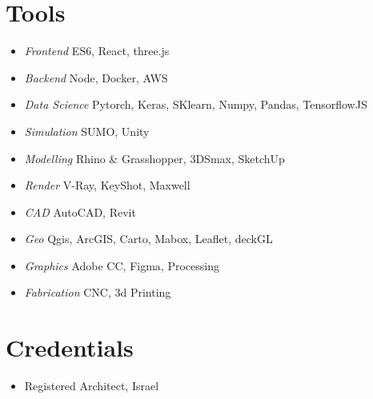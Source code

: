 \section*{Tools}
    
\begin{itemize}
    \item \textit{Frontend} \tab ES6, React, three.js
    \item \textit{Backend} \tab Node, Docker, AWS 
    \item \textit{Data Science} \tab Pytorch, Keras, SKlearn, Numpy, Pandas, TensorflowJS 
    \item \textit{Simulation} \tab SUMO, Unity
    \item \textit{Modelling} \tab Rhino \& Grasshopper, 3DSmax, SketchUp 
    \item \textit{Render} \tab V-Ray, KeyShot, Maxwell
    \item \textit{CAD} \tab AutoCAD, Revit
    \item \textit{Geo} \tab Qgis, ArcGIS, Carto, Mabox, Leaflet, deckGL 
    \item \textit{Graphics} \tab Adobe CC, Figma, Processing
    \item \textit{Fabrication} \tab CNC, 3d Printing 
\end{itemize}

\section*{Credentials}

    \begin{itemize}
        \item Registered Architect, Israel 
    \end{itemize}



  















